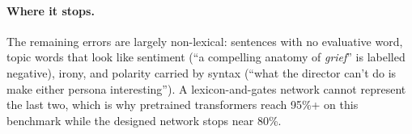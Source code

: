 \paragraph{Where it stops.} The remaining errors are largely non-lexical: sentences
with no evaluative word, topic words that look like sentiment (``a compelling anatomy
of \emph{grief}'' is labelled negative), irony, and polarity carried by syntax (``what
the director can't do is make either persona interesting''). A lexicon-and-gates
network cannot represent the last two, which is why pretrained transformers reach
95\%+ on this benchmark while the designed network stops near 80\%.
